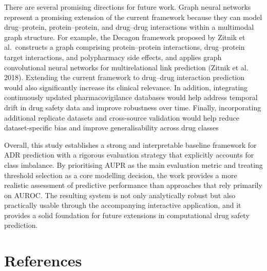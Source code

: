 \documentclass{article}
\begin{document}
There are several promising directions for future work. Graph neural
networks represent a promising extension of the current framework
because they can model drug--protein, protein--protein, and drug--drug
interactions within a multimodal graph structure. For example, the
Decagon framework proposed by Zitnik et al.~constructs a graph
comprising protein--protein interactions, drug--protein target
interactions, and polypharmacy side effects, and applies graph
convolutional neural networks for multirelational link prediction
(Zitnik et al. 2018). Extending the current framework to drug--drug
interaction prediction would also significantly increase its clinical
relevance. In addition, integrating continuously updated
pharmacovigilance databases would help address temporal drift in drug
safety data and improve robustness over time. Finally, incorporating
additional replicate datasets and cross-source validation would help
reduce dataset-specific bias and improve generalisability across drug
classes

Overall, this study establishes a strong and interpretable baseline
framework for ADR prediction with a rigorous evaluation strategy that
explicitly accounts for class imbalance. By prioritising AUPR as the
main evaluation metric and treating threshold selection as a core
modelling decision, the work provides a more realistic assessment of
predictive performance than approaches that rely primarily on AUROC. The
resulting system is not only analytically robust but also practically
usable through the accompanying interactive application, and it provides
a solid foundation for future extensions in computational drug safety
prediction.

\section*{References}\label{references}
\end{document}
